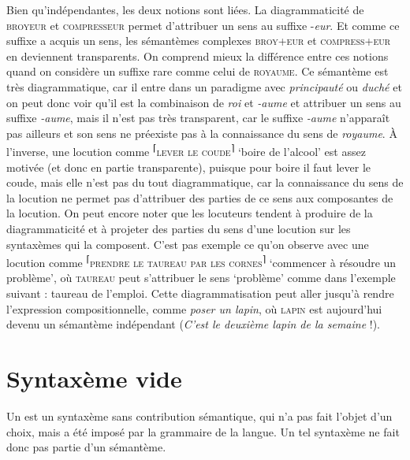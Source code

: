 Bien qu’indépendantes, les deux notions sont liées. La diagrammaticité de \textsc{broyeur} et \textsc{compresseur} permet d’attribuer un sens au suffixe -\textit{eur}. Et comme ce suffixe a acquis un sens, les sémantèmes complexes \textsc{broy+eur} et \textsc{compress+eur} en deviennent transparents. On comprend mieux la différence entre ces notions quand on considère un suffixe rare comme celui de \textsc{royaume}. Ce sémantème est très diagrammatique, car il entre dans un paradigme avec \textit{principauté} ou \textit{duché} et on peut donc voir qu’il est la combinaison de \textit{roi} et \textit{{}-aume} et attribuer un sens au suffixe \textit{{}-aume}, mais il n’est pas très transparent, car le suffixe \textit{{}-aume} n’apparaît pas ailleurs et son sens ne préexiste pas à la connaissance du sens de \textit{royaume}. À l’inverse, une locution comme \textsuperscript{⌈}\textsc{lever} \textsc{le} \textsc{coude}\textsuperscript{⌉} ‘boire de l’alcool’ est assez motivée (et donc en partie transparente), puisque pour boire il faut lever le coude, mais elle n’est pas du tout diagrammatique, car la connaissance du sens de la locution ne permet pas d’attribuer des parties de ce sens aux composantes de la locution. On peut encore noter que les locuteurs tendent à produire de la diagrammaticité et à projeter des parties du sens d’une locution sur les syntaxèmes qui la composent. C’est pas exemple ce qu’on observe avec une locution comme \textsuperscript{⌈}\textsc{prendre} \textsc{le} \textsc{taureau} \textsc{par} \textsc{les} \textsc{cornes}\textsuperscript{⌉} ‘commencer à résoudre un problème’, où \textsc{taureau} peut s’attribuer le sens ‘problème’ comme dans l’exemple suivant :  taureau de l’emploi. Cette diagrammatisation peut aller jusqu’à rendre l’expression compositionnelle, comme \textit{poser un lapin}, où \textsc{lapin} est aujourd’hui devenu un sémantème indépendant (\textit{C’est le deuxième lapin de la semaine} !).

\section{Syntaxème vide}\label{sec:2.3.3}

\begin{styleLivreImportant}
Un  est un syntaxème sans contribution sémantique, qui n’a pas fait l’objet d’un choix, mais a été imposé par la grammaire de la langue. Un tel syntaxème ne fait donc pas partie d’un sémantème.
\end{styleLivreImportant}

